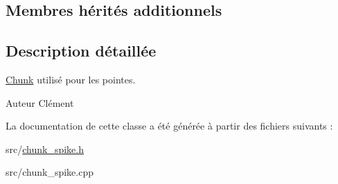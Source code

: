\subsection*{Membres hérités additionnels}


\subsection{Description détaillée}
\hyperlink{class_chunk}{Chunk} utilisé pour les pointes. 

\begin{DoxyAuthor}{Auteur}
Clément 
\end{DoxyAuthor}


La documentation de cette classe a été générée à partir des fichiers suivants \+:\begin{DoxyCompactItemize}
\item 
src/\hyperlink{chunk__spike_8h}{chunk\+\_\+spike.\+h}\item 
src/chunk\+\_\+spike.\+cpp\end{DoxyCompactItemize}
